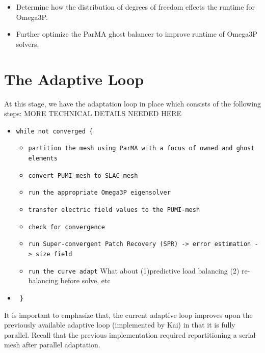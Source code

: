 \documentclass[review,12pt]{elsarticle_summary_report}
\begin{document}
\begin{itemize}
  \item Determine how the distribution of degrees of freedom effects the runtime for Omega3P.
  \item Further optimize the ParMA ghost balancer to improve runtime of Omega3P solvers.
\end{itemize}


\clearpage
\newpage

\section{\label{adaptive_loop}The Adaptive Loop}
At this stage, we have the adaptation loop in place which consists of the following steps: \color{red} MORE TECHNICAL DETAILS NEEDED HERE \color{black}

\begin{itemize}
  \item[] \texttt{while not converged \{ }
   \begin{itemize}
     \item \texttt{partition the mesh using ParMA with a focus of owned and ghost elements}
     \item \texttt{convert PUMI-mesh to SLAC-mesh}
     \item \texttt{run the appropriate Omega3P eigensolver}
     \item \texttt{transfer electric field values to the PUMI-mesh}
     \item \texttt{check for convergence}
     \item \texttt{run Super-convergent Patch Recovery (SPR) -> error estimation -> size field}
     \item \texttt{run the curve adapt} \color{red} What about (1)predictive load balancing (2) re-balancing before solve, etc \color{black}
   \end{itemize}

 \item[] \texttt{  \} }
\end{itemize}
It is important to emphasize that, the current adaptive loop improves upon the previously available adaptive loop (implemented by Kai) in that it is fully parallel. Recall that the previous implementation required repartitioning a serial mesh after parallel adaptation.
\end{document}
